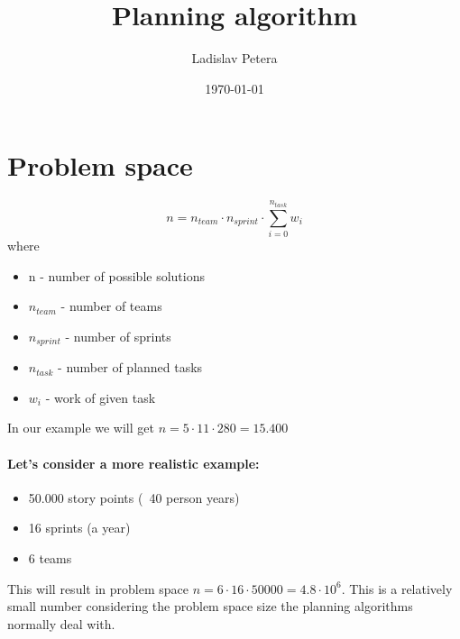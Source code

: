 \documentclass[10pt,a4paper]{article}
\title{Planning algorithm}
\author{Ladislav Petera}
\date{\today}
\begin{document}
\maketitle

\section{Problem space}

$$n = n_{team} \cdot n_{sprint} \cdot \sum_{i=0}^{n_{task}}{w_i} $$ where
\begin{itemize}
\item n - number of possible solutions
\item $n_{team}$ - number of teams
\item $n_{sprint}$ - number of sprints
\item $n_{task}$ - number of planned tasks
\item $w_i$ - work of given task
\end{itemize}

In our example we will get $n = 5 \cdot 11 \cdot 280 = 15.400$

\paragraph{Let's consider a more realistic example:}

\begin{itemize}
\item 50.000 story points (~40 person years)
\item 16 sprints (a year)
\item 6 teams
\end{itemize}

This will result in problem space $n = 6 \cdot 16 \cdot 50000 = 4.8 \cdot 10^6$.
This is a relatively small number considering the problem space size the planning algorithms normally deal with.
\end{document}
